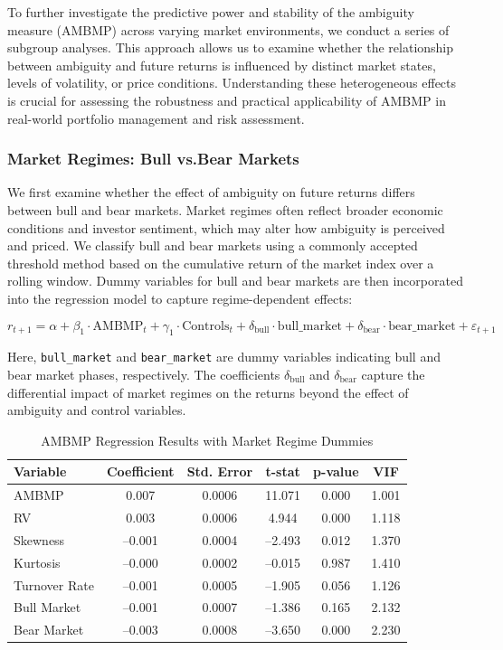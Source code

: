 \documentclass[preprint,12pt,authoryear]{elsarticle}
\begin{document}
To further investigate the predictive power and stability of the ambiguity measure (AMBMP) across varying market environments, we conduct a series of subgroup analyses. This approach allows us to examine whether the relationship between ambiguity and future returns is influenced by distinct market states, levels of volatility, or price conditions. Understanding these heterogeneous effects is crucial for assessing the robustness and practical applicability of AMBMP in real-world portfolio management and risk assessment.

\subsubsection{Market Regimes: Bull vs.Bear Markets} \label{subsec:market_regimes}

We first examine whether the effect of ambiguity on future returns differs between bull and bear markets. Market regimes often reflect broader economic conditions and investor sentiment, which may alter how ambiguity is perceived and priced. We classify bull and bear markets using a commonly accepted threshold method based on the cumulative return of the market index over a rolling window. Dummy variables for bull and bear markets are then incorporated into the regression model to capture regime-dependent effects:

\begin{equation}
r_{t+1} = \alpha + \beta_1 \cdot \mathrm{AMBMP}_t + \gamma_1 \cdot \mathrm{Controls}_t + \delta_{\text{bull}} \cdot \text{bull\_market} + \delta_{\text{bear}} \cdot \text{bear\_market} + \varepsilon_{t+1}
\end{equation}

Here, \texttt{bull\_market} and \texttt{bear\_market} are dummy variables indicating bull and bear market phases, respectively. The coefficients $\delta_{\text{bull}}$ and $\delta_{\text{bear}}$ capture the differential impact of market regimes on the returns beyond the effect of ambiguity and control variables.

\begin{table}[h!]
\centering
\caption{AMBMP Regression Results with Market Regime Dummies}
\label{tab:ambmp_regression_results}
\begin{tabular}{lccccc}
\toprule
\textbf{Variable} & \textbf{Coefficient} & \textbf{Std. Error} & \textbf{t-stat} & \textbf{p-value} & \textbf{VIF} \\
\midrule
AMBMP & 0.007 & 0.0006 & 11.071 & 0.000 & 1.001 \\
RV & 0.003 & 0.0006 & 4.944 & 0.000 & 1.118 \\
Skewness & –0.001 & 0.0004 & –2.493 & 0.012 & 1.370 \\
Kurtosis & –0.000 & 0.0002 & –0.015 & 0.987 & 1.410 \\
Turnover Rate & –0.001 & 0.0005 & –1.905 & 0.056 & 1.126 \\
Bull Market & –0.001 & 0.0007 & –1.386 & 0.165 & 2.132 \\
Bear Market & –0.003 & 0.0008 & –3.650 & 0.000 & 2.230 \\
\bottomrule
\end{tabular}
\end{table}
\end{document}
